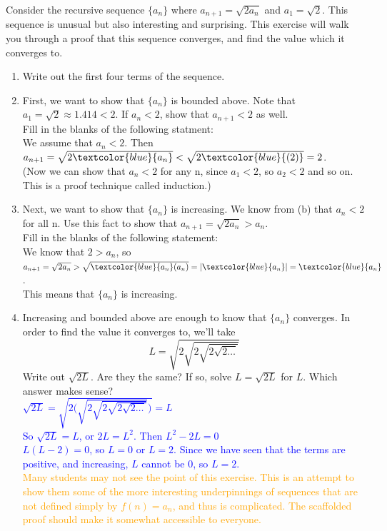 \documentclass{ximera}
\begin{document}
\begin{exercise}
     Consider the recursive sequence $\{a_n\}$ where $a_{n+1}=\sqrt{2a_n}$ and $a_1=\sqrt{2}$. This sequence is unusual but also interesting and surprising.  This exercise will walk you through a proof that this sequence converges, and find the value which it converges to.
\begin{enumerate}
    \item Write out the first four terms of the sequence.
    \vspace{.5in}
    \item First, we want to show that $\{a_n\}$ is bounded above. Note that $a_1=\sqrt{2}\approx1.414<2$.  If $a_n<2$, show that $a_{n+1}<2$ as well.  \\
    Fill in the blanks of the following statment:\\
    We assume that $a_n<2$.  Then $a_{n+1}=\sqrt{2\textcolor{blue}{a_n}}<\sqrt{2\textcolor{blue}{(2)}}=2$.\\
    (Now we can show that $a_n<2$ for any n, since $a_1<2$, so $a_2<2$ and so on. This is a proof technique called induction.)
    \item Next, we want to show that $\{a_n\}$ is increasing.  We know from (b) that $a_n<2$ for all n.  Use this fact to show that $a_{n+1}=\sqrt{2a_n}>a_n.$\\
    Fill in the blanks of the following statement:\\
    We know that $2>a_n$, so $a_{n+1}=\sqrt{2a_n}>\sqrt{\textcolor{blue}{a_n}(a_n)}=|\textcolor{blue}{a_n}|=\textcolor{blue}{a_n}$. \\
    This means that $\{a_n\}$ is increasing.
    \item Increasing and bounded above are enough to know that $\{a_n\}$ converges.  In order to find the value it converges to, we'll take $$L=\sqrt{2\sqrt{2\sqrt{2\sqrt{2\dots}}}}$$  Write out $\sqrt{2L}$.  Are they the same?  If so, solve $L=\sqrt{2L}$ for $L$.  Which answer makes sense?\\
    \textcolor{blue}{ $\sqrt{2L}=\sqrt{2\bigg(\sqrt{2\sqrt{2\sqrt{2\sqrt{2\dots}}}}\bigg)}=L$\\
    So $\sqrt{2L}=L$, or $2L=L^2$.  Then $L^2-2L=0$\\
    $L(L-2)=0$, so $L=0$ or $L=2$.  Since we have seen that the terms are positive, and increasing, $L$ cannot be 0, so $L=2$.}\\
    \textcolor{orange}{Many students may not see the point of this exercise.  This is an attempt to show them some of the more interesting underpinnings of sequences that are not defined simply by $f(n)=a_n$, and thus is complicated.  The scaffolded proof should make it somewhat accessible to everyone.}
\end{enumerate}

\end{exercise}
\end{document}
